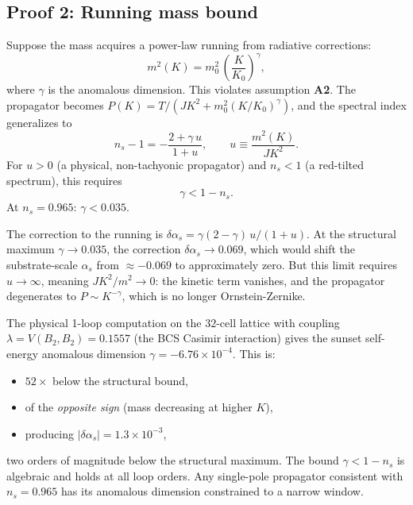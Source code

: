 \documentclass[12pt]{article}
\theoremstyle{definition}
\theoremstyle{remark}
\begin{document}
\subsection{Proof 2: Running mass bound}\label{sec:proof2}

Suppose the mass acquires a power-law running from radiative corrections:
\begin{equation}\label{eq:running-mass}
  m^2(K) = m_0^2\,\left(\frac{K}{K_0}\right)^{\!\gamma},
\end{equation}
where $\gamma$ is the anomalous dimension. This violates assumption \textbf{A2}. The propagator becomes $P(K) = T/(JK^2 + m_0^2 (K/K_0)^\gamma)$, and the spectral index generalizes to
\begin{equation}\label{eq:ns-running}
  n_s - 1 = -\frac{2 + \gamma\,u}{1 + u}, \qquad u \equiv \frac{m^2(K)}{JK^2}.
\end{equation}
For $u > 0$ (a physical, non-tachyonic propagator) and $n_s < 1$ (a red-tilted spectrum), this requires
\begin{equation}\label{eq:gamma-bound}
  \boxed{\gamma < 1 - n_s.}
\end{equation}
At $n_s = 0.965$: $\gamma < 0.035$.

The correction to the running is $\delta\alpha_s = \gamma(2-\gamma)\,u/(1+u)$. At the structural maximum $\gamma \to 0.035$, the correction $\delta\alpha_s \to 0.069$, which would shift the substrate-scale $\alpha_s$ from $\approx -0.069$ to approximately zero. But this limit requires $u \to \infty$, meaning $JK^2/m^2 \to 0$: the kinetic term vanishes, and the propagator degenerates to $P \sim K^{-\gamma}$, which is no longer Ornstein-Zernike.

The physical 1-loop computation on the $32$-cell lattice with coupling $\lambda = V(B_2, B_2) = 0.1557$ (the BCS Casimir interaction) gives the sunset self-energy anomalous dimension $\gamma = -6.76 \times 10^{-4}$. This is:
\begin{itemize}
  \item $52\times$ below the structural bound,
  \item of the \emph{opposite sign} (mass decreasing at higher $K$),
  \item producing $|\delta\alpha_s| = 1.3 \times 10^{-3}$,
\end{itemize}
two orders of magnitude below the structural maximum. The bound $\gamma < 1 - n_s$ is algebraic and holds at all loop orders. Any single-pole propagator consistent with $n_s = 0.965$ has its anomalous dimension constrained to a narrow window.
\end{document}
